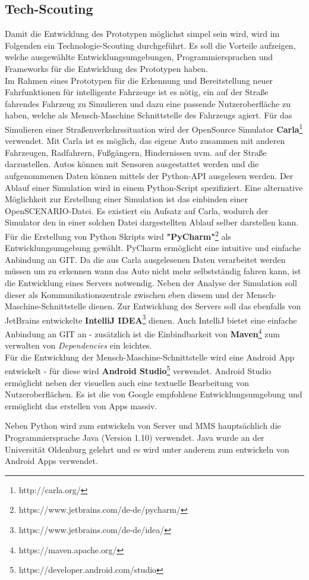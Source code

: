 \subsection{Tech-Scouting}
Damit die Entwicklung des Prototypen möglichst simpel sein wird, wird im Folgenden ein Technologie-Scouting durchgeführt. Es soll die Vorteile aufzeigen, welche ausgewählte Entwicklungsumgebungen, Programmiersprachen und Frameworks für die Entwicklung des Prototypen haben.\\

Im Rahmen eines Prototypen für die Erkennung und Bereitstellung neuer Fahrfunktionen für intelligente Fahrzeuge ist es nötig, ein auf der Straße fahrendes Fahrzeug zu Simulieren und dazu eine passende Nutzeroberfläche zu haben, welche als Mensch-Maschine Schnittstelle des Fahrzeugs agiert. Für das Simulieren einer Straßenverkehrssituation wird der OpenSource Simulator \textbf{Carla}\footnote{http://carla.org/} verwendet.
Mit Carla ist es möglich, das eigene Auto zusammen mit anderen Fahrzeugen, Radfahrern, Fußgängern, Hindernissen uvm. auf der Straße darzustellen. Autos können mit Sensoren ausgestattet werden und die aufgenommenen Daten können mittels der Python-API ausgelesen werden. Der Ablauf einer Simulation wird in einem Python-Script spezifiziert. Eine alternative Möglichkeit zur Erstellung einer Simulation ist das einbinden einer OpenSCENARIO-Datei. Es existiert ein Aufsatz auf Carla, wodurch der Simulator den in einer solchen Datei dargestellten Ablauf selber darstellen kann.\\

Für die Erstellung von Python Skripts wird \textbf{"PyCharm"}\footnote{https://www.jetbrains.com/de-de/pycharm/} als Entwicklungsumgebung gewählt. PyCharm ermöglicht eine intuitive und einfache Anbindung an GIT. Da die aus Carla ausgelesenen Daten verarbeitet werden müssen um zu erkennen wann das Auto nicht mehr selbstständig fahren kann, ist die Entwicklung eines Servers notwendig. Neben der Analyse der Simulation soll dieser als Kommunikationszentrale zwischen eben diesem und der Mensch-Maschine-Schnittstelle dienen. Zur Entwicklung des Servers soll das ebenfalls von JetBrains entwickelte \textbf{IntelliJ IDEA}\footnote{https://www.jetbrains.com/de-de/idea/} dienen. Auch IntelliJ bietet eine einfache Anbindung an GIT an - zusätzlich ist die Einbindbarkeit von \textbf{Maven}\footnote{https://maven.apache.org/} zum verwalten von \textit{Dependencies} ein leichtes.\\

Für die Entwicklung der Mensch-Maschine-Schnittstelle wird eine Android App entwickelt - für diese wird \textbf{Android Studio}\footnote{https://developer.android.com/studio} verwendet. Android Studio ermöglicht neben der visuellen auch eine textuelle Bearbeitung von Nutzeroberflächen. Es ist die von Google empfohlene Entwicklungsumgebung und ermöglicht das erstellen von Apps massiv.

Neben Python wird zum entwickeln von Server und MMS hauptsächlich die Programmiersprache Java (Version 1.10) verwendet. Java wurde an der Universität Oldenburg gelehrt und es wird unter anderem zum entwickeln von Android Apps verwendet.
